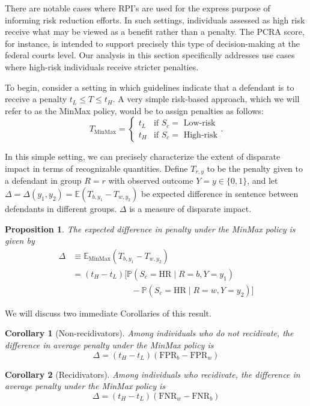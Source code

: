 \documentclass[11pt, svgnames, twocolumn]{article}
\newcommand{\E}{\mathbb{E}}
\renewcommand{\P}{\mathbb{P}}
\newcommand{\fpr}{\mathrm{FPR}}
\newcommand{\fnr}{\mathrm{FNR}}
\numberwithin{equation}{section}
\theoremstyle{plain}
\newtheorem{prop}{Proposition}
\newtheorem{corollary}{Corollary}
\theoremstyle{definition}
\numberwithin{theorem}{section}
\numberwithin{prop}{section}
\numberwithin{corollary}{section}
\numberwithin{definition}{section}
\begin{document}
There are notable cases where RPI's are used for the express purpose of informing risk reduction efforts.  In such settings, individuals assessed as high risk receive what may be viewed as a benefit rather than a penalty.  The PCRA score, for instance, is intended to support precisely this type of decision-making at the federal courts level.  Our analysis in this section specifically addresses use cases where high-risk individuals receive stricter penalties.

To begin, consider a setting in which guidelines indicate that a defendant is to receive a penalty $t_L \le T \le t_H$.  A very simple risk-based approach, which we will refer to as the MinMax policy, would be to assign penalties as follows:
\begin{equation}
 T_{\mathrm{MinMax}} =  \begin{cases}
      t_L & \text{if } S_c =  \text{ Low-risk} \\
      t_H & \text{if } S_c =  \text{ High-risk}
      \end{cases}.
\end{equation}

In this simple setting, we can precisely characterize the extent of disparate impact in terms of recognizable quantities. Define $T_{r,y}$ to be the penalty given to a defendant in group $R = r$ with observed outcome $Y=y \in\{0,1\}$, and let $\Delta = \Delta(y_1, y_2) = \E(T_{b,y_1} - T_{w,y_2})$ be expected difference in sentence between defendants in different groups.  $\Delta$ is a measure of disparate impact.

\begin{prop}
  The expected difference in penalty under the MinMax policy is given by
  \begin{align*}
  \Delta &\equiv \E_\mathrm{MinMax} (T_{b,y_1}  - T_{w,y_2}) \\ 
  &= (t_H- t_L)\big[\P(S_c = \text{HR} \mid R = b, Y = y_1)  \\
  & \hspace{7em} - \P(S_c = \text{HR} \mid R = w, Y = y_2)\big]
  \end{align*}
\end{prop}
\noindent We will discuss two immediate Corollaries of this result.
\begin{corollary}[Non-recidivators]
  Among individuals who \emph{do not recidivate}, the difference in average penalty under the MinMax policy is 
  \begin{equation}
    \Delta = (t_H - t_L)(\fpr_b - \fpr_w)
    \label{eq:survive}
  \end{equation}
\end{corollary}
%
\begin{corollary}[Recidivators]
  Among individuals who \emph{recidivate}, the difference in average penalty under the MinMax policy is 
  \begin{equation}
    \Delta = (t_H - t_L)(\fnr_w - \fnr_b)
    \label{eq:recid}
  \end{equation}
\end{corollary}
\end{document}
